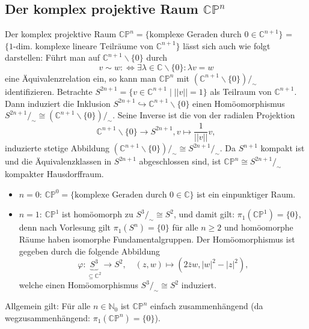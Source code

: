 \documentclass[a4paper,11pt,notitlepage]{report}
\theoremstyle{definition}
\newcommand{\N}{{\ensuremath{\mathbb{N}}}}
\newcommand{\C}{{\ensuremath{\mathbb{C}}}}
\newcommand{\Prim}{{\ensuremath{\mathbb{P}}}}
\begin{document}
\subsection{Der komplex projektive Raum $\C \Prim^n$}
	Der komplex projektive Raum $\C \Prim^n = \{\text{komplexe Geraden durch } 0 \in \C^{n+1}\}$ = $\{\text{1-dim. komplexe lineare Teilräume von } \C^{n+1}\}$ lässt sich auch wie folgt darstellen:
	\newline
	Führt man auf $\C^{n+1} \backslash \{0\}$ durch 
	$$v \sim w :\Leftrightarrow \exists \lambda \in \C \backslash \{0\} \colon \lambda v = w$$
	eine Äquivalenzrelation ein, so kann man $\C \Prim^n$ mit $(\C^{n+1} \backslash \{0\})/_\sim$ identifizieren.
	\newline
	Betrachte $S^{2n+1} = \{v \in \C^{n+1} \mid || v || = 1\}$ als Teilraum von $\C^{n+1}$. Dann induziert die Inklusion $S^{2n+1} \hookrightarrow \C^{n+1} \backslash \{0\}$ einen Homöomorphismus $S^{2n+1} /_\sim \cong (\C^{n+1} \backslash \{0\}) /_\sim$.
	\newline
	Seine Inverse ist die von der radialen Projektion $$\C^{n+1} \backslash \{0\} \rightarrow S^{2n+1}, v \mapsto \frac{1}{||v||} v,$$ induzierte stetige Abbildung $(\C^{n+1} \backslash \{0\})/_\sim \cong S^{2n+1} /_\sim$. 
	\newline
	Da $S^{n+1}$ kompakt ist und die Äquivalenzklassen in $S^{2n+1}$ abgeschlossen sind, ist $\C \Prim^n \cong S^{2n+1} /_\sim$ kompakter Hausdorffraum.  
	\begin{itemize}
		\item \underline{$n = 0$}: $\C \Prim^0 = \{\text{komplexe Geraden durch } 0 \in \C\}$ ist ein einpunktiger Raum.
		\item \underline{$n=1$}: $\C \Prim^1$ ist homöomorph zu $S^3 /_\sim \cong S^2$, und damit gilt: \newline $\pi_1(\C \Prim^1) = \{0\}$, denn nach Vorlesung gilt $\pi_1(S^n) = \{0\}$ für alle $n \geq 2$ und homöomorphe Räume haben isomorphe Fundamentalgruppen.
		\newline
		Der Homöomorphismus ist gegeben durch die folgende Abbildung
		$$\varphi \colon \underbrace{S^3}_{\subseteq \C^2} \rightarrow S^2, \quad (z,w) \mapsto (2 \bar{z} w, |w|^2 - |z|^2),$$
		welche einen Homöomorphismus $S^3 /_\sim \cong S^2$ induziert.
	\end{itemize}

Allgemein gilt: Für alle $n \in \N_0$ ist $\C \Prim^n$ einfach zusammenhängend (da wegzusammenhängend: $\pi_1(\C \Prim^n) = \{0\}$).
\end{document}
